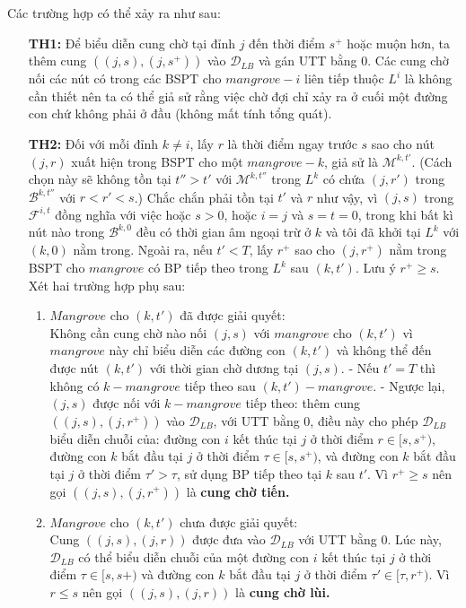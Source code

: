 \documentclass[../main.tex]{subfiles}
\begin{document}
Các trường hợp có thể xảy ra như sau:

\begin{enumerate}
\def\labelenumi{\arabic{enumi}.}
\item[\textbf{TH1:}]
Để biểu diễn cung chờ tại đỉnh \(j\) đến thời
  điểm \(s^+\) hoặc muộn hơn, ta thêm cung \(((j, s), (j, s^+))\) vào
  \(\mathcal D_{LB}\) và gán UTT bằng \(0\). Các cung chờ nối các nút có
  trong các BSPT cho \(mangrove-i\) liên tiếp thuộc \(L^i\) là không cần
  thiết nên ta có thể giả sử rằng việc chờ đợi chỉ xảy ra ở cuối một
  đường con chứ không phải ở đầu (không mất tính tổng quát).
\item[\textbf{TH2:}]
   Đối với mỗi đỉnh \(k\neq i\), lấy \(r\) là thời
  điểm ngay trước \(s\) sao cho nút \((j,r)\) xuất hiện trong BSPT cho
  một \(mangrove-k\), giả sử là \(\mathcal M^{k,t'}\). (Cách chọn này sẽ
  không tồn tại \(t'' > t'\) với \(\mathcal M^{k,t''}\) trong \(L^k\) có
  chứa \((j,r')\) trong \(\mathcal B^{k,t''}\) với \(r < r' < s\).) Chắc
  chắn phải tồn tại \(t'\) và \(r\) như vậy, vì \((j, s)\) trong
  \(\mathcal F^{i,t}\) đồng nghĩa với việc hoặc \(s>0\), hoặc \(i = j\) và
  \(s = t = 0\), trong khi bất kì nút nào trong \(\mathcal B^{k,0}\) đều có
  thời gian âm ngoại trừ ở \(k\) và tôi đã khởi tại \(L^k\) với
  \((k,0)\) nằm trong. Ngoài ra, nếu \(t'<T\), lấy \(r^+\) sao cho
  \((j,r^+)\) nằm trong BSPT cho \(mangrove\) có BP tiếp theo
  trong \(L^k\) sau \((k, t')\). Lưu ý \(r^+ \geq s\). Xét hai trường
  hợp phụ sau:

  \begin{enumerate}
  \def\labelenumii{\alph{enumii}.}
  \tightlist
  \item
    \(Mangrove\) cho \((k, t')\) đã được giải quyết: \\
    Không cần cung chờ
    nào nối \((j,s)\) với \(mangrove\) cho \((k,t')\) vì \(mangrove\)
    này chỉ biểu diễn các đường con \((k,t')\) và không thể đến được nút
    \((k, t')\) với thời gian chờ dương tại \((j, s)\). - Nếu \(t'=T\)
    thì không có \(k-mangrove\) tiếp theo sau \((k,t')-mangrove\). -
    Ngược lại, \((j,s)\) được nối với \(k-mangrove\) tiếp theo: thêm
    cung \(((j,s),(j,r^+))\) vào \(\mathcal D_{LB}\), với UTT bằng
    \(0\), điều này cho phép \(\mathcal D_{LB}\) biểu diễn chuỗi của:
    đường con \(i\) kết thúc tại \(j\) ở thời điểm \(r\in [s,s^+)\),
    đường con \(k\) bắt đầu tại \(j\) ở thời điểm \(\tau \in [s, s^+)\),
    và đường con \(k\) bắt đầu tại \(j\) ở thời điểm \(\tau' > \tau\),
    sử dụng BP tiếp theo tại \(k\) sau \(t'\). Vì \(r^+ \geq s\)
    nên gọi \(((j,s),(j,r^+))\) là \textbf{cung chờ tiến.}
  \item
    \(Mangrove\) cho \((k, t')\) chưa được giải quyết: \\
    Cung
    \(((j,s),(j,r))\) được đưa vào \(\mathcal D_{LB}\) với UTT bằng 0.
    Lúc này, \(\mathcal D_{LB}\) có thể biểu diễn chuỗi của một đường
    con \(i\) kết thúc tại \(j\) ở thời điểm \(\tau \in [s,s+)\) và
    đường con \(k\) bắt đầu tại \(j\) ở thời điểm
    \(\tau' \in [\tau,r^+)\). Vì \(r\leq s\) nên gọi \(((j,s),(j,r))\)
    là \textbf{cung chờ lùi.}
  \end{enumerate}
\end{enumerate}
\end{document}
